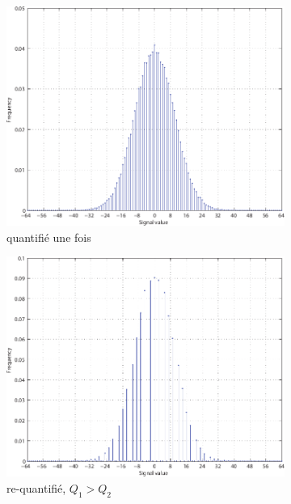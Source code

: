 \documentclass[utf8,final]{stageM2R} %
\begin{document}
\begin{figure}
  \begin{subfigure}{.33\textwidth}
    \centering
    \includegraphics[width=\linewidth]{images/h1}
    \caption{quantifié une fois}
    \label{ha}
  \end{subfigure}
  \begin{subfigure}{.33\textwidth}
    \centering
    \includegraphics[width=\linewidth]{images/h2}
    \caption{re-quantifié, $Q_{1} > Q_{2}$}
    \label{hb}
  \end{subfigure}
  \begin{subfigure}{.33\textwidth}
    \centering

\end{subfigure}
\end{figure}
\end{document}
